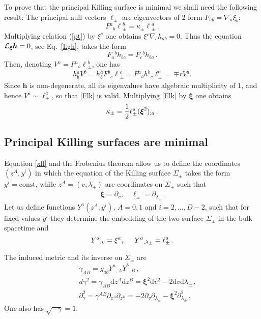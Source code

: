 \documentclass[superscriptaddress,twocolumn,showpacs,
preprintnumbers,amsmath,amssymb,nofootinbib,
longbibliography,aps,prd,10pt]{revtex4-1}
\newcommand{\hh}{,\hspace{0.5cm}}
\newcommand{\ts}[1]{{\boldsymbol{#1}}}         %
\newcommand{\dd}{\mbox{d}}
\newcommand{\be}{\begin{equation}}             %
\newcommand{\ee}{\end{equation}}               %
\newcommand{\ba}{\begin{eqnarray}}             %
\newcommand{\ea}{\end{eqnarray}}               %
\newcommand{\n}[1]{\label{#1}}
\begin{document}
To prove that the principal Killing surface is minimal we shall need the following result:
The principal null vectors $\ts{\ell}_{\pm}$ are eigenvectors of 2-form $F_{ab}= \nabla_a\xi_b$:
\be\n{Flk}
F{}^a{}_b \ell{}^b_{\pm} = \kappa_{\pm} \ell{}^a_{\pm}\, .
\ee
Multiplying relation (\ref{pt}) by $\xi^c$ one obtains $\xi{}^c \nabla{}_c h{}_{ab} = 0$. Thus the equation ${\cal L}_{\ts{\xi}}\ts{h}=0$, see Eq.~\eqref{Lgh}, takes the form
\be
F_a{}^b h{}_{bc}= F{}_{c}{}^b h{}_{ba}\, .
\ee
Then, denoting $V{}^a = F{}^a{}_b \ell{}_{\pm}^b$, one has
\begin{align}
h{}^a_b V{}^b = h{}^a_b F{}^b{}_c \ell{}_{\pm}^c = F{}^a{}_b h{}^b{}_c \ell_{\pm}^c =\mp r V{}^a .
\end{align}
Since $\ts{h}$ is non-degenerate, all its eigenvalues have algebraic multiplicity of 1, and hence $V{}^a \sim \ell^a_\pm$, so that \eqref{Flk} is valid. Multiplying \eqref{Flk} by $\ts{\xi}$ one obtains
\be
\kappa_{\pm}={1\over 2}\ell_{\pm}^a (\ts{\xi}^2)_{;a}\, .
\ee

\subsection{Principal Killing surfaces are minimal}

Equation \eqref{xll} and the Frobenius theorem allow us to define the coordinates $(z^A,y^i)$ in which the equation of the Killing surface $\Sigma_{\pm}$ takes the form $y^i=\text{const}$, while $z^A=(v,\lambda_{\pm})$ are coordinates on $\Sigma_{\pm}$ such that
\begin{align}
\ts{\xi} = \partial{}_v , \quad \ts{\ell}_\pm = \partial{}_{\lambda_{\pm}} .
\end{align}
Let us define functions $Y^a(z^A,y^i)$, $A=0,1$ and $i=2,\ldots,D-2$, such that for fixed values $y^i$ they determine the embedding of the two-surface $\Sigma_{\pm}$ in the bulk spacetime and
\be\n{YYY}
Y^a{}_{,v}=\xi^a\hh Y^a{}_{,\lambda_{\pm}}=\ell_{\pm}^a\, .
\ee

The induced metric and its inverse on $\Sigma_\pm$ are
\ba
&& \gamma_{AB}=g_{ab} Y^a{}_{,A} Y^b{}_{,B}\, ,\\
&&d\gamma^2=\gamma_{AB} \dd z^A \dd z^B=\ts{\xi}^2 \dd v^2-2 \dd v \dd\lambda_{\pm}\, ,\\
&& \partial_\gamma^2 = \gamma{}^{AB} \partial_{z{}^A} \partial_{z{}^B} = -2 \partial_v \partial_{\lambda_{\pm}} - \ts{\xi}^2 \partial_{\lambda_{\pm}}^2 \, .
\ea
One also has $\sqrt{-\gamma} = 1$.
\end{document}
